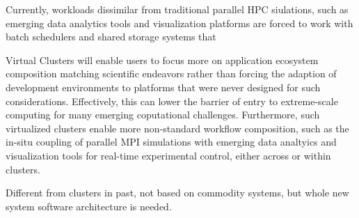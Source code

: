 Currently, workloads dissimilar from traditional parallel HPC siulations, such as emerging data analytics tools and visualization platforms are forced to work with batch schedulers and shared storage systems that  

Virtual Clusters will enable users to focus more on application ecosystem composition matching scientific endeavors rather than forcing the adaption of development environments to platforms that were never designed for such considerations.  Effectively, this can lower the barrier of entry to extreme-scale computing for many emerging coputational challenges.  Furthermore, such virtualized clusters enable more non-standard workflow composition, such as the in-situ coupling of parallel MPI simulations with emerging data analtyics and visualization tools for real-time experimental control, either across or within clusters. 


Different from clusters in past, not based on commodity systems, but whole new system software architecture is needed.



